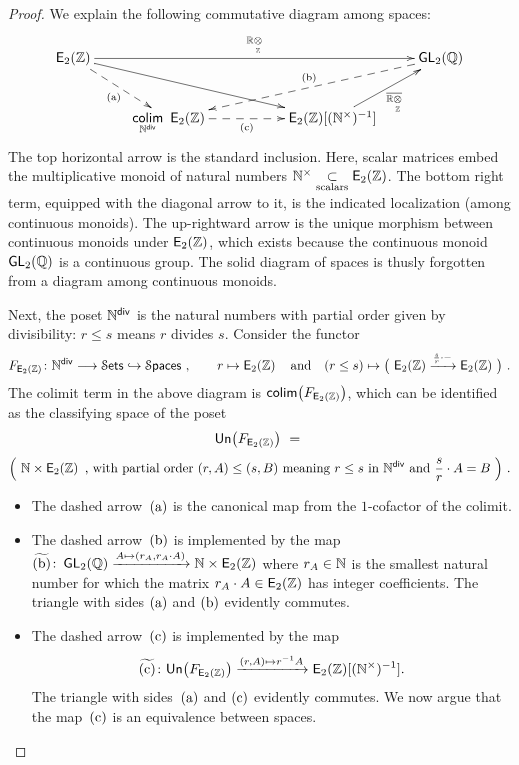 \begin{proof}
We explain the following commutative diagram among spaces:
\[
\xymatrix{
\EZ
\ar[rrrr]^-{\RR\underset{\ZZ}\ot }
\ar@{-->}[dr]_-{\rm (a)}
\ar[drrr]
&
&&
&
\GL_2(\QQ)
\ar@{-->}[dlll]_-{\rm (b)}
\\
&
\underset{\NN^{\sf div}}\colim
~\EZ
\ar@{-->}[rr]_-{\rm (c)}
&&
\EZ[ (\NN^\times)^{-1} ]
\ar[ur]_-{\ov{\RR\underset{\ZZ}\ot}}
&
}
\]
The top horizontal arrow is the standard inclusion.
Here, scalar matrices embed the multiplicative monoid of natural numbers $\mathbb N^\times \underset{\rm scalars}\subset \operatorname{\mathsf E_2(\mathbb Z)}$.
The bottom right term, equipped with the diagonal arrow to it, is the indicated localization (among continuous monoids). 
The up-rightward arrow is the unique morphism between continuous monoids under $\operatorname{\mathsf E_2(\mathbb Z)}$, which exists because the continuous monoid $\operatorname{\sf GL}_2(\mathbb Q)$ is a continuous group.
The solid diagram of spaces is thusly forgotten from a diagram among continuous monoids.  


Next, the poset $\mathbb N^{\sf div}$ is the natural numbers with partial order given by divisibility: $r\leq s$ means $r$ divides $s$.   
Consider the functor 
\[
F_{\operatorname{\mathsf E_2(\mathbb Z)}} \colon \mathbb N^{\sf div} \longrightarrow \operatorname{\mathcal S\mathsf{ets}}
\hookrightarrow
\operatorname{\mathcal S\mathsf{paces}}
~,\qquad
r\mapsto \operatorname{\mathsf E_2(\mathbb Z)}
~{}~
\text{ and }
~{}~
(r\leq s)
\mapsto 
\bigl(
~
\operatorname{\mathsf E_2(\mathbb Z)} \xrightarrow{ \frac{s}{r} \cdot -} \operatorname{\mathsf E_2(\mathbb Z)}
~
\bigr)
~.
\]
The colimit term in the above diagram is 
$
\operatorname{{\sf colim}}\bigl( 
F_{\operatorname{\mathsf E_2(\mathbb Z)}}
\bigr)
$,
which can be identified as the classifying space of the poset
\[
{\sf Un}\bigl( F_{\operatorname{\mathsf E_2(\mathbb Z)}} \bigr)
~=~
\]
\[
\Bigl(
~
\mathbb N\times \operatorname{\mathsf E_2(\mathbb Z)}
\text{ , with partial order }(r,A) \leq (s,B) \text{ meaning }
r\leq s \text{ in }\mathbb N^{\sf div}
\text{ and }
\frac{s}{r} \cdot A=B
~
\Bigr)
~.
\]
\begin{itemize}
\item
The dashed arrow~$\rm (a)$ is the canonical map from the $1$-cofactor of the colimit.  

\item
The dashed arrow~$\rm (b)$ is implemented by the map $\widetilde{\rm (b)}\colon \operatorname{\sf GL}_2(\mathbb Q)\xrightarrow{A\mapsto (r_A,r_A\cdot A)} \mathbb N\times \operatorname{\mathsf E_2(\mathbb Z)}$ where $r_A\in \mathbb N$ is the smallest natural number for which the matrix $r_A\cdot  A\in \operatorname{\mathsf E_2(\mathbb Z)}$ has integer coefficients.
The triangle with sides $\rm (a)$ and $\rm (b)$ evidently commutes.   

\item
The dashed arrow~$\rm (c)$ is implemented by the map \[
\widetilde{\rm (c)}\colon
{\sf Un}\bigl( F_{\operatorname{\mathsf E_2(\mathbb Z)}} \bigr)
 \xrightarrow{(r,A)\mapsto r^{-1}A} \operatorname{\mathsf E_2(\mathbb Z)}[ (\mathbb N^\times)^{-1} ].
 \]The triangle with sides~$\rm (a)$ and $\rm (c)$ evidently commutes.
We now argue that the map~$\rm (c)$ is an equivalence between spaces.  



\end{itemize}
\end{proof}
